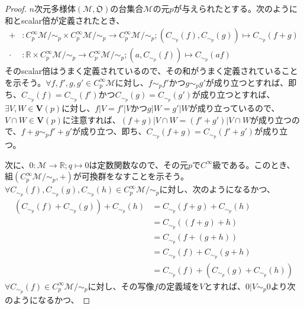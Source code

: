 \documentclass[dvipdfmx]{jsarticle}
\begin{document}
\begin{proof}
  $n$次元多様体$\left(\mathcal{M},\mathfrak{O}\right)$の台集合$\mathcal{M}$の元$p$が与えられたとする。次のように和とscalar倍が定義されたとき、
  \begin{align*}
    +&:C^\infty_p \mathcal{M} /\sim_p \times C^\infty_p \mathcal{M} /\sim_p \rightarrow C^\infty_p \mathcal{M} /\sim_p ; \left( C_{\sim_p} \left(f\right),C_{\sim_p} \left(g\right)\right) \mapsto C_{\sim_p} \left(f+g\right) \\
    \cdot &: \mathbb{R} \times C^\infty_p \mathcal{M} /\sim_p \rightarrow C^\infty_p \mathcal{M} /\sim_p ; \left( a,C_{\sim_p } \left(f\right) \right) \mapsto C_{\sim_p} \left(af\right)
  \end{align*}
  そのscalar倍はうまく定義されているので、その和がうまく定義されていることを示そう。$\forall f,f',g,g' \in C^\infty_p \mathcal{M}$に対し、$f\sim_p f'$かつ$g\sim_p g'$が成り立つとすれば、即ち、$C_{\sim_p} \left(f\right) =C_{\sim_p } \left(f'\right)$かつ$C_{\sim_p} \left(g\right) =C_{\sim_p } \left(g'\right)$が成り立つとすれば、$\exists V,W\in \mathbf{V} \left(p\right)$に対し、$f|V=f'|V$かつ$g|W=g'|W$が成り立っているので、$V\cap W\in \mathbf{V} \left(p\right)$に注意すれば、$\left(f+g\right)|V\cap W=\left(f'+g'\right)|V\cap W$が成り立つので、$f+g\sim_p f'+g'$が成り立つ、即ち、$C_{\sim_p } \left(f+g\right) =C_{\sim_p } \left(f'+g'\right)$が成り立つ。\par
  次に、$0:\mathcal{M} \rightarrow \mathbb{R} ;q\mapsto 0$は定数関数なので、その元$p$で$C^\infty $級である。このとき、組$\left(C^\infty_p \mathcal{M}/\sim_p,+\right)$が可換群をなすことを示そう。$\forall C_{\sim_p } \left(f\right) ,C_{\sim_p } \left(g\right) ,C_{\sim_p } \left(h\right) \in C^\infty_p \mathcal{M}/\sim_p$に対し、次のようになるかつ、
  \begin{align*}
    \left(C_{\sim_p} \left(f\right) +C_{\sim_p } \left(g\right) \right) +C_{\sim_p } \left(h\right) &=C_{\sim_p } \left(f+g\right) +C_{\sim_p } \left(h\right) \\
    &=C_{\sim_p } \left(\left(f+g\right)+h\right) \\
    &=C_{\sim_p } \left(f+\left(g+h\right)\right) \\
    &=C_{\sim_p } \left(f\right) +C_{\sim_p } \left(g+h\right) \\
    &=C_{\sim_p } \left(f\right) +\left(C_{\sim_p } \left(g\right) +C_{\sim_p } \left(h\right) \right) 
  \end{align*}
  $\forall C_{\sim_p } \left(f\right) \in C^\infty_p \mathcal{M}/\sim_p$に対し、その写像$f$の定義域を$V$とすれば、$0|V\sim_p 0$より次のようになるかつ、

\end{proof}
\end{document}
